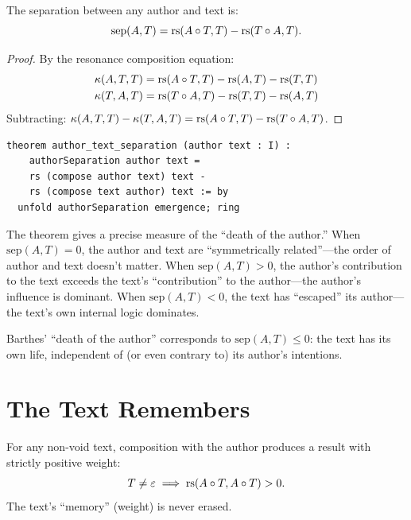\begin{theorem}
\label{thm:author-text}
The separation between any author and text is:
\[
  \mathrm{sep}(A, T) = \mathrm{rs}(A \circ T, T) - \mathrm{rs}(T \circ A, T).
\]
\end{theorem}

\begin{proof}
By the resonance composition equation:
\begin{align*}
  \kappa(A, T, T) &= \mathrm{rs}(A \circ T, T) - \mathrm{rs}(A, T) - \mathrm{rs}(T, T) \\
  \kappa(T, A, T) &= \mathrm{rs}(T \circ A, T) - \mathrm{rs}(T, T) - \mathrm{rs}(A, T)
\end{align*}
Subtracting:
$\kappa(A, T, T) - \kappa(T, A, T) = \mathrm{rs}(A \circ T, T) - \mathrm{rs}(T \circ A, T)$.
\end{proof}

\begin{lstlisting}
theorem author_text_separation (author text : I) :
    authorSeparation author text =
    rs (compose author text) text -
    rs (compose text author) text := by
  unfold authorSeparation emergence; ring
\end{lstlisting}

\begin{remark}
The theorem gives a precise measure of the ``death of the author.''
When $\mathrm{sep}(A, T) = 0$, the author and text are
``symmetrically related''---the order of author and text doesn't matter.
When $\mathrm{sep}(A, T) > 0$, the author's contribution to the text
exceeds the text's ``contribution'' to the author---the author's
influence is dominant.  When $\mathrm{sep}(A, T) < 0$, the text has
``escaped'' its author---the text's own internal logic dominates.

Barthes' ``death of the author'' corresponds to $\mathrm{sep}(A, T) \leq 0$:
the text has its own life, independent of (or even contrary to) its
author's intentions.
\end{remark}

\section{The Text Remembers}

\begin{theorem}
\label{thm:text-remembers}
For any non-void text, composition with the author produces a result
with strictly positive weight:
\[
  T \neq \varepsilon \implies \mathrm{rs}(A \circ T, A \circ T) > 0.
\]
The text's ``memory'' (weight) is never erased.
\end{theorem}

